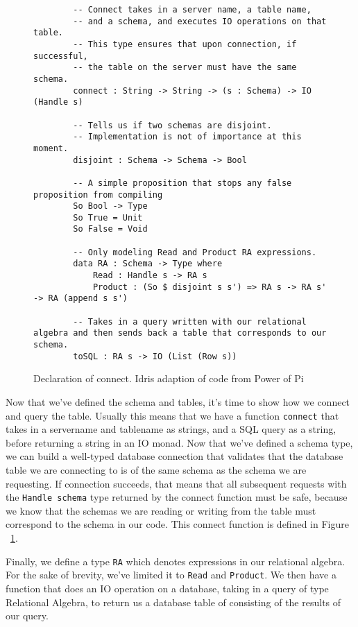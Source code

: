 \begin{figure}[ht!]
    \caption{Declaration of connect. Idris adaption of code from Power of Pi
    \protect\cite{power_of_pi}}
    \label{connect}
    \begin{lstlisting}
        -- Connect takes in a server name, a table name, 
        -- and a schema, and executes IO operations on that table. 
        -- This type ensures that upon connection, if successful, 
        -- the table on the server must have the same schema. 
        connect : String -> String -> (s : Schema) -> IO (Handle s)

        -- Tells us if two schemas are disjoint. 
        -- Implementation is not of importance at this moment. 
        disjoint : Schema -> Schema -> Bool

        -- A simple proposition that stops any false proposition from compiling
        So Bool -> Type
        So True = Unit
        So False = Void

        -- Only modeling Read and Product RA expressions.
        data RA : Schema -> Type where
            Read : Handle s -> RA s
            Product : (So $ disjoint s s') => RA s -> RA s' -> RA (append s s')
        
        -- Takes in a query written with our relational algebra and then sends back a table that corresponds to our schema. 
        toSQL : RA s -> IO (List (Row s))
    \end{lstlisting}
\end{figure}

Now that we've defined the schema and tables, it's time to show how we connect
and query the table. Usually this means that we have a function \texttt{connect}
that takes in a servername and tablename as strings, and a SQL query as a
string, before returning a string in an IO monad. Now that we've defined a
schema type, we can build a well-typed database connection that validates that
the database table we are connecting to is of the same schema as the schema we
are requesting. If connection succeeds, that means that all subsequent requests
with the \texttt{Handle schema} type returned by the connect function must be
safe, because we know that the schemas we are reading or writing from the table
must correspond to the schema in our code. This connect function is defined in
Figure ~\ref{connect}. 

Finally, we define a type \texttt{RA} which denotes expressions in our
relational algebra. For the sake of brevity, we've limited it to \texttt{Read}
and \texttt{Product}. We then have a function that does an IO operation on a
database, taking in a query of type Relational Algebra, to return us a database
table of consisting of the results of our query. 

